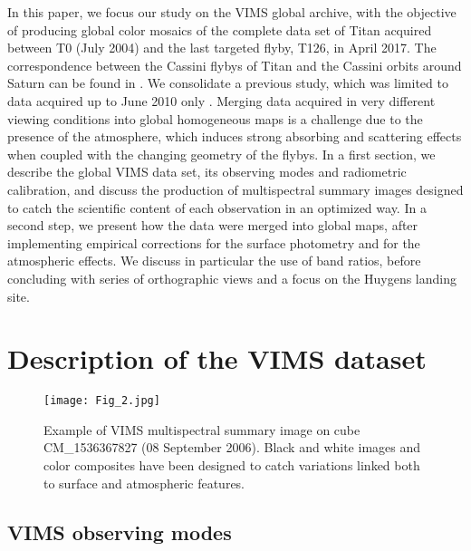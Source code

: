 \documentclass[preprint,twocolumn,5p,authoryear,compress,colorlinks=true]{elsarticle}
\begin{document}
In this paper, we focus our study on the VIMS global archive, with the objective of producing global color mosaics of the complete data set of Titan acquired between T0 (July 2004) and the last targeted flyby, T126, in April 2017. The correspondence between the Cassini flybys of Titan and the Cassini orbits around Saturn can be found in \cite{Seignovert2015}. We consolidate a previous study, which was limited to data acquired up to June 2010 only \citep{LeMouelic2012a}. Merging data acquired in very different viewing conditions into global homogeneous maps is a challenge due to the presence of the atmosphere, which induces strong absorbing and scattering effects when coupled with the changing geometry of the flybys. In a first section, we describe the global VIMS data set, its observing modes and radiometric calibration, and discuss the production of multispectral summary images designed to catch the scientific content of each observation in an optimized way. In a second step, we present how the data were merged into global maps, after implementing empirical corrections for the surface photometry and for the atmospheric effects. We discuss in particular the use of band ratios, before concluding with series of orthographic views and a focus on the Huygens landing site.

\section{Description of the VIMS dataset}

\begin{figure*}[!ht]
 \texttt{[image: Fig\_2.jpg]}
 \caption{Example of VIMS multispectral summary image on cube CM\_1536367827 (08 September 2006). Black and white images and color composites have been designed to catch variations linked both to surface and atmospheric features.}
 \label{fig:fig_2}
\end{figure*}

\subsection{VIMS observing modes}
\end{document}
